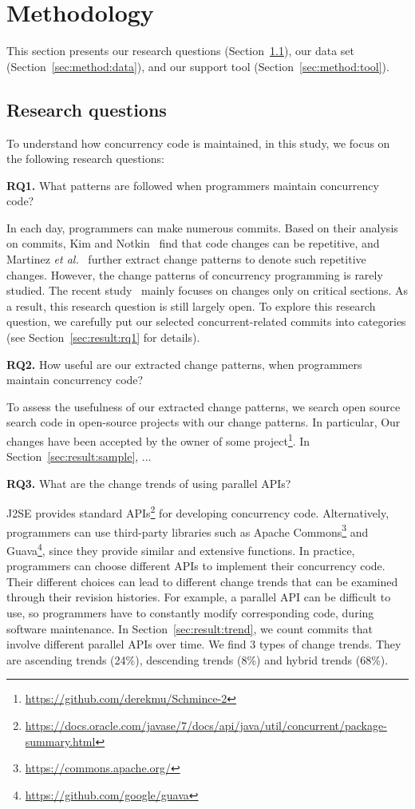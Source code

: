 \section{Methodology}
\label{sec:method}
This section presents our research questions (Section~\ref{sec:method:rq}), our data set (Section~\ref{sec:method:data}), and our support tool (Section~\ref{sec:method:tool}).
\subsection{Research questions}
\label{sec:method:rq}
To understand how concurrency code is maintained, in this study, we focus on the following research questions:

\textbf{RQ1.} What patterns are followed when programmers maintain concurrency code?

In each day, programmers can make numerous commits. Based on their analysis on commits, Kim and Notkin~\cite{conf/icse/KimN09} find that code changes can be repetitive, and Martinez \emph{et al.}~\cite{conf/icsm/MartinezDM13} further extract change patterns to denote such repetitive changes. However, the change patterns of concurrency programming is rarely studied. The recent study~\cite{conf/sigsoft/GuJSZL15} mainly focuses on changes only on critical sections. As a result, this research question is still largely open. To explore this research question, we carefully put our selected concurrent-related commits into  categories (see Section~\ref{sec:result:rq1} for details).


\textbf{RQ2.} How useful are our extracted change patterns, when programmers maintain concurrency code?

To assess the usefulness of our extracted change patterns, we search open source search code in open-source projects with our change patterns. In particular,  Our changes have been accepted by the owner of some project\footnote{\url{https://github.com/derekmu/Schmince-2}}. In Section~\ref{sec:result:sample}, ...



\textbf{RQ3.} What are the change trends of using parallel APIs?

J2SE provides standard APIs\footnote{\url{https://docs.oracle.com/javase/7/docs/api/java/util/concurrent/package-summary.html}} for developing concurrency code. Alternatively, programmers can use third-party libraries such as Apache Commons\footnote{\url{https://commons.apache.org/}} and Guava\footnote{\url{https://github.com/google/guava}}, since they provide similar and extensive functions. In practice, programmers can choose different APIs to implement their concurrency code. Their different choices can lead to different change trends that can be examined through their revision histories. For example, a parallel API can be difficult to use, so programmers have to constantly modify corresponding code, during software maintenance. In Section~\ref{sec:result:trend}, we count commits that involve different parallel APIs over time. We find 3 types of change trends. They are ascending trends (24\%), descending trends (8\%) and hybrid trends (68\%).%

